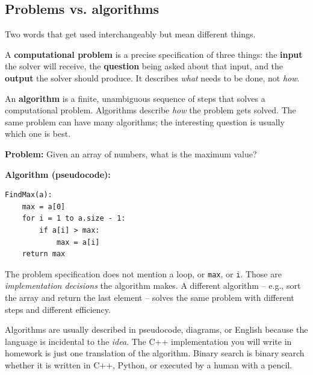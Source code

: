 \documentclass[11pt]{article}
\begin{document}
\subsection{Problems vs. algorithms}

Two words that get used interchangeably but mean different things.

\begin{defnbox}
A \textbf{computational problem} is a precise specification of three
things: the \textbf{input} the solver will receive, the
\textbf{question} being asked about that input, and the \textbf{output}
the solver should produce. It describes \emph{what} needs to be done,
not \emph{how}.
\end{defnbox}

\begin{defnbox}[Algorithm]
An \textbf{algorithm} is a finite, unambiguous sequence of steps that
solves a computational problem. Algorithms describe \emph{how} the
problem gets solved. The same problem can have many algorithms; the
interesting question is usually which one is best.
\end{defnbox}

\begin{examplebox}
\textbf{Problem:} Given an array of numbers, what is the maximum value?

\textbf{Algorithm (pseudocode):}
\begin{verbatim}
FindMax(a):
    max = a[0]
    for i = 1 to a.size - 1:
        if a[i] > max:
            max = a[i]
    return max
\end{verbatim}
The problem specification does not mention a loop, or
\texttt{max}, or \texttt{i}. Those are \emph{implementation decisions}
the algorithm makes. A different algorithm -- e.g., sort the array and
return the last element -- solves the same problem with different
steps and different efficiency.
\end{examplebox}

\begin{notebox}
Algorithms are usually described in pseudocode, diagrams, or English
because the language is incidental to the \emph{idea}. The C++
implementation you will write in homework is just one translation of
the algorithm. Binary search is binary search whether it is written
in C++, Python, or executed by a human with a pencil.
\end{notebox}
\end{document}
